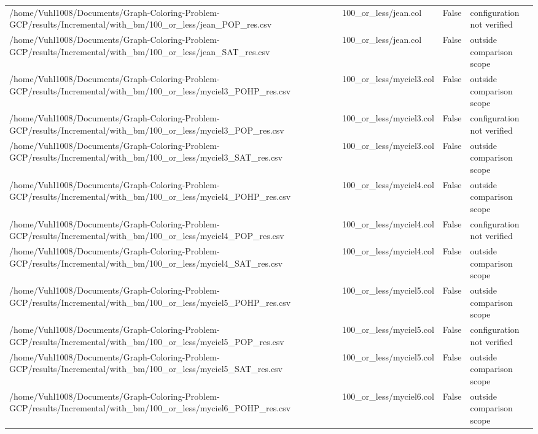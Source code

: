 \begin{table}[htbp]
\begin{tabular}{llll}
/home/Vuhl1008/Documents/Graph-Coloring-Problem-GCP/results/Incremental/with\_bm/100\_or\_less/jean\_POP\_res.csv & 100\_or\_less/jean.col & False & configuration not verified \\
/home/Vuhl1008/Documents/Graph-Coloring-Problem-GCP/results/Incremental/with\_bm/100\_or\_less/jean\_SAT\_res.csv & 100\_or\_less/jean.col & False & outside comparison scope \\
/home/Vuhl1008/Documents/Graph-Coloring-Problem-GCP/results/Incremental/with\_bm/100\_or\_less/myciel3\_POHP\_res.csv & 100\_or\_less/myciel3.col & False & outside comparison scope \\
/home/Vuhl1008/Documents/Graph-Coloring-Problem-GCP/results/Incremental/with\_bm/100\_or\_less/myciel3\_POP\_res.csv & 100\_or\_less/myciel3.col & False & configuration not verified \\
/home/Vuhl1008/Documents/Graph-Coloring-Problem-GCP/results/Incremental/with\_bm/100\_or\_less/myciel3\_SAT\_res.csv & 100\_or\_less/myciel3.col & False & outside comparison scope \\
/home/Vuhl1008/Documents/Graph-Coloring-Problem-GCP/results/Incremental/with\_bm/100\_or\_less/myciel4\_POHP\_res.csv & 100\_or\_less/myciel4.col & False & outside comparison scope \\
/home/Vuhl1008/Documents/Graph-Coloring-Problem-GCP/results/Incremental/with\_bm/100\_or\_less/myciel4\_POP\_res.csv & 100\_or\_less/myciel4.col & False & configuration not verified \\
/home/Vuhl1008/Documents/Graph-Coloring-Problem-GCP/results/Incremental/with\_bm/100\_or\_less/myciel4\_SAT\_res.csv & 100\_or\_less/myciel4.col & False & outside comparison scope \\
/home/Vuhl1008/Documents/Graph-Coloring-Problem-GCP/results/Incremental/with\_bm/100\_or\_less/myciel5\_POHP\_res.csv & 100\_or\_less/myciel5.col & False & outside comparison scope \\
/home/Vuhl1008/Documents/Graph-Coloring-Problem-GCP/results/Incremental/with\_bm/100\_or\_less/myciel5\_POP\_res.csv & 100\_or\_less/myciel5.col & False & configuration not verified \\
/home/Vuhl1008/Documents/Graph-Coloring-Problem-GCP/results/Incremental/with\_bm/100\_or\_less/myciel5\_SAT\_res.csv & 100\_or\_less/myciel5.col & False & outside comparison scope \\
/home/Vuhl1008/Documents/Graph-Coloring-Problem-GCP/results/Incremental/with\_bm/100\_or\_less/myciel6\_POHP\_res.csv & 100\_or\_less/myciel6.col & False & outside comparison scope \\

\end{tabular}
\end{table}
